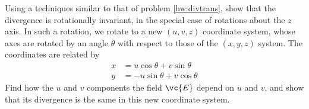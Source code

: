         Using a techniques similar to that of problem \ref{hw:divtrans},
        show that the divergence is rotationally invariant,
        in the special case of rotations about the $z$ axis.
        In such a rotation, we rotate to a new $(u,v,z)$
        coordinate system, whose axes are rotated by an angle
        $\theta $ with respect to those of the $(x,y,z)$ system. The
        coordinates are related by
        \begin{align*}
                        x  &=  u \cos  \theta  + v \sin  \theta   \\
                        y  &=  -u \sin  \theta  + v \cos  \theta   
        \end{align*}
        Find how the $u$ and $v$ components the field $\vc{E}$ depend on $u$
        and $v$, and show that its divergence is the same in this
        new coordinate system.
